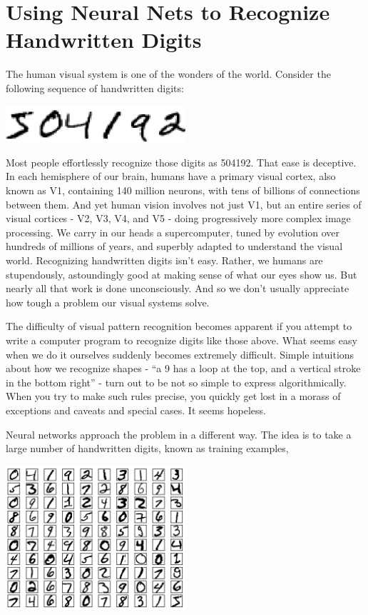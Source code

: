 


\chapter{Using Neural Nets to Recognize Handwritten Digits}
\label{sec:UsingNeuralNetsTorRcognizeHandWrittenDigits}

The human visual system is one of the wonders of the world. Consider the following sequence of handwritten digits: 

{\centering
\includegraphics[width=0.5\textwidth,]{pic/504192}
\par}

Most people effortlessly recognize those digits as 504192. That ease is deceptive. In each hemisphere of our brain, humans have a primary visual cortex, also known as V1, containing 140 million neurons, with tens of billions of connections between them. And yet human vision involves not just V1, but an entire series of visual cortices - V2, V3, V4, and V5 - doing progressively more complex image processing. We carry in our heads a supercomputer, tuned by evolution over hundreds of millions of years, and superbly adapted to understand the visual world. Recognizing handwritten digits isn't easy. Rather, we humans are stupendously, astoundingly good at making sense of what our eyes show us. But nearly all that work is done unconsciously. And so we don't usually appreciate how tough a problem our visual systems solve.

The difficulty of visual pattern recognition becomes apparent if you attempt to write a computer program to recognize digits like those above. What seems easy when we do it ourselves suddenly becomes extremely difficult. Simple intuitions about how we recognize shapes - ``a 9 has a loop at the top, and a vertical stroke in the bottom right'' - turn out to be not so simple to express algorithmically. When you try to make such rules precise, you quickly get lost in a morass of exceptions and caveats and special cases. It seems hopeless.

Neural networks approach the problem in a different way. The idea is to take a large number of handwritten digits, known as training examples,

{\centering
\includegraphics[width=0.5\textwidth,]{pic/gridnumbers}
\par}

